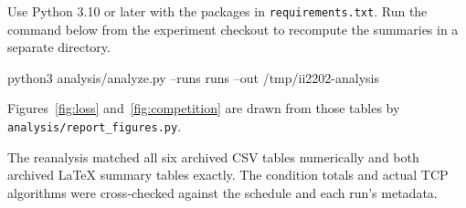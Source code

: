 \documentclass[11pt,a4paper]{article}
\begin{document}
Use Python 3.10 or later with the packages in \texttt{requirements.txt}. Run the command below from the experiment checkout to recompute the summaries in a separate directory.

{\ttfamily python3 analysis/analyze.py --runs runs --out /tmp/ii2202-analysis\par}

Figures~\ref{fig:loss} and~\ref{fig:competition} are drawn from those tables by \texttt{analysis/report\_figures.py}.

The reanalysis matched all six archived CSV tables numerically and both archived LaTeX summary tables exactly. The condition totals and actual TCP algorithms were cross-checked against the schedule and each run's metadata.
\end{document}
